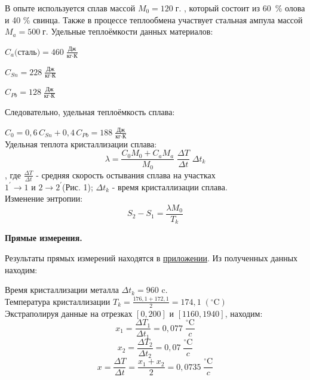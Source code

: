 \documentclass{article}
\begin{document}
 В опыте используется сплав массой $ M_0=120\;\mbox{г.}$ , который состоит из 60~\% олова и 40 \% свинца. Также в процессе теплообмена участвует стальная  ампула массой $ M_a = 500\;\mbox{г.}$ Удельные теплоёмкости данных материалов:
 
 $ C_a\mbox{(сталь)} = 460\; \frac{\mbox{Дж}}{\mbox{кг} \cdot \mbox{К}}$
 
 $ C_{Sn} = 228\; \frac{\mbox{Дж}}{\mbox{кг} \cdot \mbox{К}}$
 
 $ C_{Pb} = 128\; \frac{\mbox{Дж}}{\mbox{кг} \cdot \mbox{К}}$
 
 Следовательно, удельная теплоёмкость сплава:
 
 $ C_0 = 0,6\,C_{Sn}+0,4\,C_{Pb} = 188\; \frac{\mbox{Дж}}{\mbox{кг} \cdot \mbox{К}}$\\
 


 Удельная теплота кристаллизации сплава:\hypertarget{formul1}{}
 \begin{equation}
 	\lambda=\frac{C_0M_0+C_aM_a}{M_0}\;\frac{\Delta T}{\Delta t}\;\Delta t_k
 \end{equation}
, где $ \frac{\Delta T}{\Delta t} $ - средняя скорость остывания сплава на участках \\
$ 1^{'}\rightarrow1 $ и $ 2\rightarrow2^{'} $(Рис. 1); $ \Delta t_k $ - время кристаллизации сплава.\\

  Изменение энтропии:\hypertarget{formul2}{}
\begin{equation}
	S_2-S_1=\frac{\lambda M_0}{T_k}
\end{equation}

\textbf{Прямые измерения.}

Результаты прямых измерений находятся в \hyperlink{table}{приложении}. Из полученных данных находим:

Время кристаллизации металла $ \Delta t_k= 960$ c.\\

Температура  кристаллизации $ T_k=\frac{176,1+172,1}{2}=174,1\;(^{\circ}\mbox{C}) $\\

Экстраполируя данные на отрезках $ [0,200] $ и $ [1160,1940] $, находим:
$$ x_1 = \frac{\Delta T_1}{\Delta t_1}=0,077\; \frac{^\circ\mbox{C}}{c}$$
$$ x_2 = \frac{\Delta T_2}{\Delta t_2}=0,07\; \frac{^\circ\mbox{C}}{c}$$
$$x=\frac{\Delta T}{\Delta t}=\frac{x_1+x_2}{2}=0,0735\; \frac{^\circ\mbox{C}}{c}$$
\end{document}

